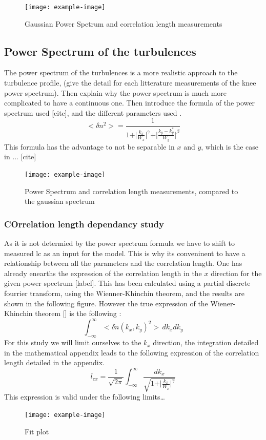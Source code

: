 \documentclass[11pt,a4paper]{report}
\begin{document}
\begin{multicols*}{2}
    \begin{figure}[H]
        \centering
        \texttt{[image: example-image]}
        \caption{Gaussian Power Spetrum and correlation length measurements}
        \label{}
    \end{figure}

    \subsection{Power Spectrum of the turbulences}
    The power spectrum of the turbulences is a more realistic approach to the turbulence profile, (give the detail for each litterature measurements of the knee power spectrum). Then explain why the power spectrum is much more complicated to have a continuous one.
    Then introduce the formula of the power spectrum used [cite], and the different parameters used .
    $$<\delta n^2 > = \frac{1}{1 + \vert \frac{k_x}{W_x} \vert^\gamma + \vert \frac{k_y - k_y^*}{W_y}\vert^\beta}$$
    This formula has the advantage to not be separable in $x$ and $y$, which is the case in ... [cite]
    \begin{figure}[H]
        \centering
        \texttt{[image: example-image]}
        \caption{Power Spectrum and correlation length measurements, compared to the gaussian spectrum}
        \label{}
    \end{figure}

    \subsubsection{COrrelation length dependancy study}
    As it is not determied by the power spectrum formula we have to shift to measured lc as an input for the model. This is why its conveninent to have a relationship between all the parameters and the correlation length.
    One has already enearths the expression of the correlation length in the $x$ direction for the given power spectrum [label]. This has been calculated using a partial discrete fourrier transform, using the Wienner-Khinchin theorem, and the results are shown in the following figure.
    However the true expression of the Wiener-Khinchin theorem [] is the following :
    $$\int_{-\infty}^{\infty} <\delta n(k_x, k_y)^2> \, dk_xdk_y$$
    For this study we will limit ourselves to the $k_x$ direction, the integration detailed in the mathematical appendix leads to the following expression of the correlation length detailed in the appendix.
    $$l_{cx} = \frac{1}{\sqrt{2\pi}} \int_{-\infty}^{\infty} \frac{dk_x}{\sqrt{1 + \vert \frac{k_x}{W_x} \vert^\gamma}}$$
    This expression is valid under the following limits\dots

    \begin{figure}
        \centering
        \texttt{[image: example-image]}
        \caption{Fit plot}
        \label{}
    \end{figure}
\end{multicols*}
\end{document}

